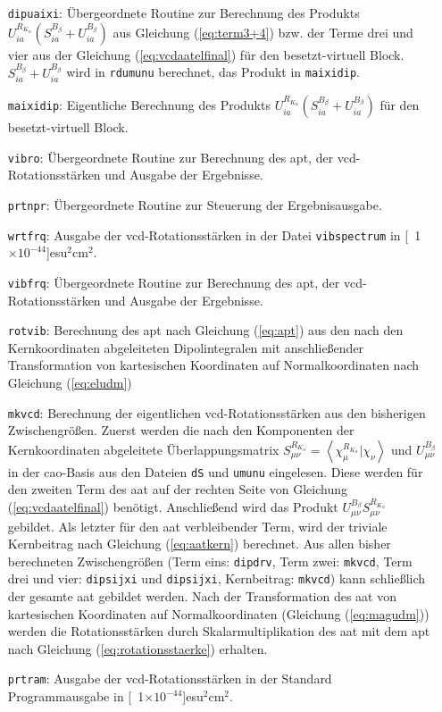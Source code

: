 \begin{itemize}
	\item[\texttt{dipuaixi}:] Übergeordnete Routine zur Berechnung des Produkts $U_{ia}^{R_{K_\alpha}}\left(S_{ia}^{B_\beta}+U_{ia}^{B_\beta}\right)$ aus Gleichung (\ref{eq:term3+4}) bzw. der Terme drei und vier aus der Gleichung (\ref{eq:vcdaatelfinal}) für den besetzt-virtuell Block. $S_{ia}^{B_\beta}+U_{ia}^{B_\beta}$ wird in \texttt{rdumunu} berechnet, das Produkt in \texttt{maixidip}.
	\item[\texttt{maixidip}:] Eigentliche Berechnung des Produkts $U_{ia}^{R_{K_\alpha}}\left(S_{ia}^{B_\beta}+U_{ia}^{B_\beta}\right)$ für den besetzt-virtuell Block.
	\item[\texttt{vibro}:] Übergeordnete Routine zur Berechnung des \ac{apt}, der \ac{vcd}-Rotationsstärken und Ausgabe der Ergebnisse.
	\item[\texttt{prtnpr}:] Übergeordnete Routine zur Steuerung der Ergebnisausgabe. 
	\item[\texttt{wrtfrq}:] Ausgabe der \ac{vcd}-Rotationsstärken in der Datei \texttt{vibspectrum} in \unit[1$\times 10^{-44}$]{esu$^2$cm$^2$}.
	\item[\texttt{vibfrq}:] Übergeordnete Routine zur Berechnung des \ac{apt}, der \ac{vcd}-Rotationsstärken und Ausgabe der Ergebnisse.
	\item[\texttt{rotvib}:] Berechnung des \ac{apt} nach Gleichung (\ref{eq:apt}) aus den nach den Kernkoordinaten abgeleiteten Dipolintegralen mit anschließender Transformation von kartesischen Koordinaten auf Normalkoordinaten nach Gleichung (\ref{eq:eludm})
	\item[\texttt{mkvcd}:] Berechnung der eigentlichen \ac{vcd}-Rotationsstärken aus den bisherigen Zwischengrößen. Zuerst werden die nach den Komponenten der Kernkoordinaten abgeleitete Überlappungsmatrix $S_{\mu\nu}^{R_{K_\alpha}}=\left\langle\chi_\mu^{R_{K_\alpha}}\vert\chi_\nu\right\rangle$ und $U_{\mu\nu}^{B_\beta}$ in der \ac{cao}-Basis aus den Dateien \texttt{dS} und \texttt{umunu} eingelesen. Diese werden für den zweiten Term des \ac{aat} auf der rechten Seite von Gleichung (\ref{eq:vcdaatelfinal}) benötigt. Anschließend wird das Produkt $U_{\mu\nu}^{B_\beta}S_{\mu\nu}^{R_{K_\alpha}}$ gebildet. Als letzter für den \ac{aat} verbleibender Term, wird der triviale Kernbeitrag nach Gleichung (\ref{eq:aatkern}) berechnet. Aus allen bisher berechneten Zwischengrößen (Term eins: \texttt{dipdrv}, Term zwei: \texttt{mkvcd}, Term drei und vier: \texttt{dipsijxi} und \texttt{dipsijxi}, Kernbeitrag: \texttt{mkvcd}) kann schließlich der gesamte \ac{aat} gebildet werden. Nach der Transformation des \ac{aat} von kartesischen Koordinaten auf Normalkoordinaten (Gleichung (\ref{eq:magudm})) werden die Rotationsstärken durch Skalarmultiplikation des \ac{aat} mit dem \ac{apt} nach Gleichung (\ref{eq:rotationsstaerke}) erhalten.  
	\item[\texttt{prtram}:] Ausgabe der \ac{vcd}-Rotationsstärken in der Standard Programmausgabe in \unit[1$\times 10^{-44}$]{esu$^2$cm$^2$}.
\end{itemize} 
	
